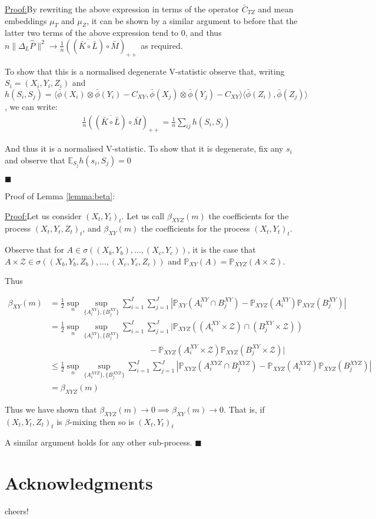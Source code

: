 \documentclass{article}
\newenvironment{claimproof}[1]{\par\noindent\underline{Proof:}\space#1}{\hfill $\blacksquare$}
\begin{document}
\begin{claimproof}
By rewriting the above expression in terms of the operator $\bar{C}_{TZ}$ and mean embeddings $\mu_T$ and $\mu_Z$, it can be shown by a similar argument to before that the latter two terms of the above expression tend to 0, and thus  $n\|\Delta_L \hat{P}\|^2 \longrightarrow \frac{1}{n}((\overline{\bar{K}\circ \bar{L}}) \circ \bar{M})_{++}$ as required.

To show that this is a normalised degenerate V-statistic observe that, writing $S_i=(X_i,Y_i,Z_i)$ and $h(S_i,S_j) = \langle\bar{\phi}(X_i)\otimes\bar{\phi}(Y_i) - C_{XY},\bar{\phi}(X_j)\otimes\bar{\phi}(Y_j) - C_{XY}\rangle\langle\bar{\phi}(Z_i),\bar{\phi}(Z_j)\rangle$, we can write:
\begin{align*}
&\frac{1}{n}((\overline{\bar{K}\circ \bar{L}}) \circ \bar{M})_{++}= \frac{1}{n}\sum_{ij} h(S_i,S_j)
\end{align*}

And thus it is a normalised V-statistic. To show that it is degenerate, fix any $s_i$ and observe that
$\mathbb{E}_{S_j}h(s_i,S_j)=0$

\end{claimproof}




Proof of Lemma \ref{lemma:beta}:
\begin{claimproof} Let us consider $(X_t,Y_t)_t$.
Let us call $\beta_{XYZ}(m)$ the coefficients for the process $(X_t,Y_t,Z_t)_t$, and $\beta_{XY}(m)$ the coefficients for the process $(X_t,Y_t)_t$. 

Observe that for $A \in \sigma((X_b,Y_b),\ldots, (X_c,Y_c))$, it is the case that $A \times \mathcal{Z} \in \sigma((X_b,Y_b,Z_b),\ldots, (X_c,Y_c,Z_c))$ and $\mathbb{P}_{XY}(A) = \mathbb{P}_{XYZ}(A\times \mathcal{Z})$.

Thus

\begin{align*}
\beta_{XY}(m) &= \frac{1}{2} \sup_n \sup_{ \{A_i^{XY} \}, \{B_j^{XY} \} } \sum_{i=1}^I \sum_{j=1}^J | \mathbb{P}_{XY}(A_i^{XY} \cap B_j^{XY}) - \mathbb{P}_{XYZ}(A_i^{XY})\mathbb{P}_{XYZ}(B_j^{XY})| \\
&= \frac{1}{2} \sup_n \sup_{ \{A_i^{XY} \}, \{B_j^{XY} \} } \sum_{i=1}^I \sum_{j=1}^J | \mathbb{P}_{XYZ}((A_i^{XY}\times \mathcal{Z}) \cap (B_j^{XY} \times \mathcal{Z})) \\& \quad \quad\quad \quad \quad \quad\quad \quad \quad \quad\quad \quad- \mathbb{P}_{XYZ}(A_i^{XY}\times \mathcal{Z})\mathbb{P}_{XYZ}(B_j^{XY} \times \mathcal{Z})| \\
& \leq \frac{1}{2} \sup_n \sup_{ \{A_i^{XYZ} \}, \{B_j^{XYZ} \} } \sum_{i=1}^I \sum_{j=1}^J | \mathbb{P}_{XYZ}(A_i^{XYZ} \cap B_j^{XYZ}) - \mathbb{P}_{XYZ}(A_i^{XYZ})\mathbb{P}_{XYZ}(B_j^{XYZ})| \\
& = \beta_{XYZ}(m)
\end{align*}

Thus we have shown that  $\beta_{XYZ}(m) \longrightarrow 0 \implies \beta_{XY}(m) \longrightarrow 0$. That is, if  $(X_t,Y_t,Z_t)_t$ is $\beta$-mixing then so is  $(X_t,Y_t)_t$ 

A similar argument holds for any other sub-process.
\end{claimproof}
\section*{Acknowledgments} 
cheers!


\end{document}
